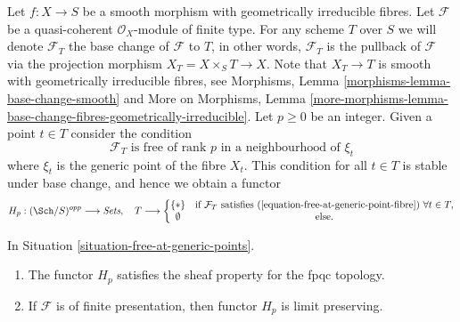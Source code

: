 \begin{situation}
\label{situation-free-at-generic-points}
Let $f : X \to S$ be a smooth morphism with geometrically irreducible
fibres. Let $\mathcal{F}$ be a quasi-coherent $\mathcal{O}_X$-module of
finite type. For any scheme $T$ over $S$ we will denote
$\mathcal{F}_T$ the base change of $\mathcal{F}$ to $T$, in other
words, $\mathcal{F}_T$ is the pullback of $\mathcal{F}$ via the
projection morphism $X_T = X \times_S T \to X$. Note that $X_T \to T$
is smooth with geometrically irreducible fibres, see
Morphisms, Lemma \ref{morphisms-lemma-base-change-smooth} and
More on Morphisms,
Lemma \ref{more-morphisms-lemma-base-change-fibres-geometrically-irreducible}.
Let $p \geq 0$ be an integer. Given a point $t \in T$ consider the
condition
\begin{equation}
\label{equation-free-at-generic-point-fibre}
\mathcal{F}_T \text{ is free of rank }p\text{ in a neighbourhood of }\xi_t
\end{equation}
where $\xi_t$ is the generic point of the fibre $X_t$. This condition
for all $t \in T$ is stable under base change, and hence we obtain a functor
\begin{equation}
\label{equation-free-at-generic-points}
H_p : (\Sch/S)^{opp} \longrightarrow \textit{Sets}, \quad
T \longrightarrow \left\{
\begin{matrix}
\{*\} & \text{if }\mathcal{F}_T\text{ satisfies
(\ref{equation-free-at-generic-point-fibre}) }\forall t\in T, \\
\emptyset & \text{else.}
\end{matrix}
\right.
\end{equation}
\end{situation}

\begin{lemma}
\label{lemma-free-at-generic-points}
In Situation \ref{situation-free-at-generic-points}.
\begin{enumerate}
\item The functor $H_p$ satisfies the sheaf property for the fpqc topology.
\item If $\mathcal{F}$ is of finite presentation, then functor $H_p$ is
limit preserving.
\end{enumerate}
\end{lemma}

